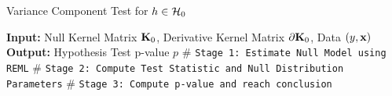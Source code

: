 \documentclass[article]{jss}
\begin{document}
\begin{algorithm}
\caption{Variance Component Test for $h \in {\cal H}_0$} 
\label{alg:cvek}
\begin{algorithmic}[1]
\newline
\textbf{Input:} Null Kernel Matrix ${\bf K}_0$, Derivative Kernel Matrix $\partial {\bf K}_0$, Data $(y, {\bf x})$\newline
\textbf{Output:} Hypothesis Test p-value $p$\newline
$\#$ \texttt{Stage 1: Estimate Null Model using REML}
\newline
$\#$ \texttt{Stage 2: Compute Test Statistic and Null Distribution Parameters}
\newline
$\#$ \texttt{Stage 3: Compute p-value and reach conclusion}
\EndProcedure
\end{algorithmic}
\end{algorithm}
\end{document}
